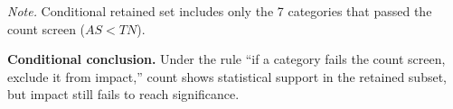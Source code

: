 \noindent\textit{Note.} Conditional retained set includes only the 7 categories that passed the count screen ($AS<TN$).

\noindent\textbf{Conditional conclusion.}
Under the rule ``if a category fails the count screen, exclude it from impact,'' count shows statistical support in the retained subset, but impact still fails to reach significance.
